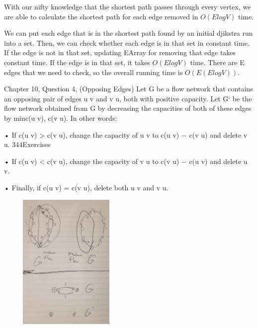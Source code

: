 \documentclass{article}
\begin{document}
With our nifty knowledge that the shortest path passes through every vertex, we
are able to calculate the shortest path for each edge removed in $O(E log V)$ time.

We can put each edge that is in the shortest path found by an initial djikstra run into a set. Then, we can check whether each edge is in that set in constant time. If the edge is not in that set, updating EArray for removing that edge takes constant time. If the edge is in that set, it takes $O(E log V)$ time. There are E edges that we need to check, so the overall running time is $O(E (E log V))$.

\collab{}
\nextprob{}

Chapter 10, Question 4, (Opposing Edges)
Let G be a flow network that contains an opposing pair of edges u  v and
v  u, both with positive capacity. Let G`  be the flow network obtained from G
by decreasing the capacities of both of these edges by min{c(u  v), c(v  u)}.
In other words:

• If c(u  v) > c(v  u), change the capacity of u  v to c(u  v) − c(v  u)
and delete v  u.
344Exercises

• If c(u  v) < c(v  u), change the capacity of v  u to c(v  u) − c(u  v)
and delete u  v.

• Finally, if c(u  v) = c(v  u), delete both u  v and v  u.

\includegraphics[width=250,height=250,keepaspectratio]{CounterExampleGraphs.jpg}
\end{document}
